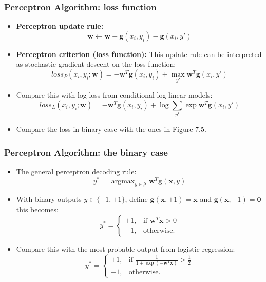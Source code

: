 \documentclass[ignorenonframetext,plain]{beamer}
\DeclareMathOperator*{\argmax}{argmax}
\newcommand{\loss}{\mathit{loss}}
\renewcommand{\vec}{\mathbf}
\begin{document}
\begin{frame}\frametitle{Perceptron Algorithm: loss function}
\begin{itemize}
\item {\bf Perceptron update rule:}
\[ \vec{w} \leftarrow \vec{w} 
+\vec{g}(x_i,y_i)
-\vec{g}(x_i,y') 
\]
\item {\bf Perceptron criterion (loss function):} This update rule can
  be interpreted as stochastic gradient descent on the loss function:
\[
\loss_P(x_i, y_i; \vec{w}) = 
-\vec{w}^T \vec{g}(x_i,y_i)
+\max_{y'} \vec{w}^T \vec{g}(x_i,y')
\]

\item Compare this with log-loss from conditional log-linear models: \[
\loss_L(x_i, y_i; \vec{w}) = 
-\vec{w}^T \vec{g}(x_i,y_i) 
+\log \sum_{y'} \exp \vec{w}^T \vec{g}(x_i,y') 
\]

\item Compare the loss in binary case with the ones in Figure 7.5.
\end{itemize}
\end{frame}

\begin{frame}\frametitle{Perceptron Algorithm: the binary case}
\begin{itemize}
\item The general perceptron decoding rule: \[
y^* = \argmax_{y\in\mathcal{Y}} \vec{w}^T \vec{g}(\vec{x}, y)
\]
\item With binary outputs $y\in\{-1,+1\}$, define $\vec{g}(\vec{x},
  +1) = \vec{x}$ and $\vec{g}(\vec{x}, -1) = \vec{0}$ this becomes: \[ 
y^* = \begin{cases}
+1,& \text{if } \vec{w}^T \vec{x} > 0\\
-1,& \text{otherwise.}
\end{cases}
\]
\item Compare this with the most probable output from logistic regression: \[
y^* = \begin{cases}
+1,& \text{if } \frac{1}{1+\exp(-\vec{w}^T \vec{x})} > \frac{1}{2} \\
-1,& \text{otherwise.}
\end{cases}
\]
\end{itemize}
\end{frame}
\end{document}
